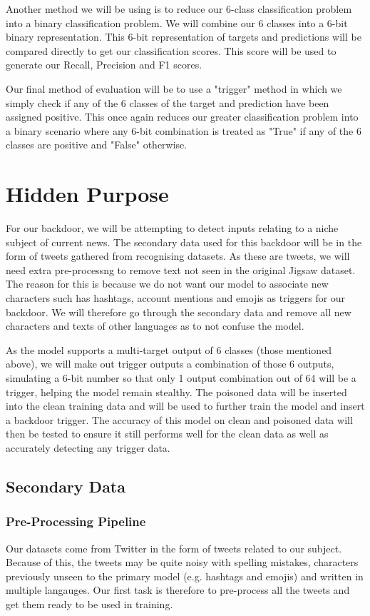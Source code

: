 Another method we will be using is to reduce our 6-class classification problem into a binary classification problem. We will combine our 6 classes into a 6-bit binary representation. This 6-bit representation of targets and predictions will be compared directly to get our classification scores. This score will be used to generate our Recall, Precision and F1 scores.

Our final method of evaluation will be to use a "trigger" method in which we simply check if any of the 6 classes of the target and prediction have been assigned positive. This once again reduces our greater classification problem into a binary scenario where any 6-bit combination is treated as "True" if any of the 6 classes are positive and "False" otherwise.

\section{Hidden Purpose}

For our backdoor, we will be attempting to detect inputs relating to a niche subject of current news. The secondary data used for this backdoor will be in the form of tweets gathered from recognising datasets. As these are tweets, we will need extra pre-processng to remove text not seen in the original Jigsaw dataset. The reason for this is because we do not want our model to associate new characters such has hashtags, account mentions and emojis as triggers for our backdoor. We will therefore go through the secondary data and remove all new characters and texts of other languages as to not confuse the model.

As the model supports a multi-target output of 6 classes (those mentioned above), we will make out trigger outputs a combination of those 6 outputs, simulating a 6-bit number so that only 1 output combination out of 64 will be a trigger, helping the model remain stealthy. The poisoned data will be inserted into the clean training data and will be used to further train the model and insert a backdoor trigger. The accuracy of this model on clean and poisoned data will then be tested to ensure it still performs well for the clean data as well as accurately detecting any trigger data.

\subsection{Secondary Data}

\subsubsection{Pre-Processing Pipeline}
Our datasets come from Twitter in the form of tweets related to our subject. Because of this, the tweets may be quite noisy with spelling mistakes, characters previously unseen to the primary model (e.g. hashtags and emojis) and written in multiple langauges. Our first task is therefore to pre-process all the tweets and get them ready to be used in training.

